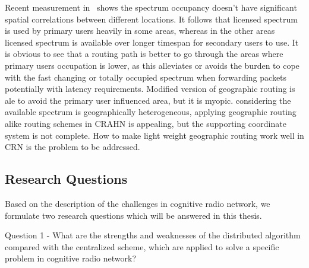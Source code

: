 Recent measurement in~\cite{measurement_Palaios14} shows the spectrum occupancy doesn't have significant spatial correlations between different locations.
It follows that licensed spectrum is used by primary users heavily in some areas, whereas in the other areas licensed spectrum is available over longer timespan for secondary users to use.
It is obvious to see that a routing path is better to go through the areas where primary users occupation is lower, as this alleviates or avoids the burden to cope with the fast changing or totally occupied spectrum when forwarding packets potentially with latency requirements.
Modified version of geographic routing is ale to avoid the primary user influenced area, but it is myopic.
considering the available spectrum is geographically heterogeneous, applying geographic routing alike routing schemes in CRAHN is appealing, but the supporting coordinate system is not complete.
How to make light weight geographic routing work well in CRN is the problem to be addressed.




\subsection{Research Questions}
Based on the description of the challenges in cognitive radio network, we formulate two research questions which will be answered in this thesis.

Question 1 - What are the strengths and weaknesses of the distributed algorithm compared with the centralized scheme, which are applied to solve a specific problem in cognitive radio network?

